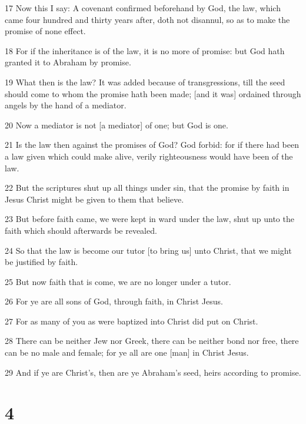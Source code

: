 \par 17 Now this I say: A covenant confirmed beforehand by God, the law, which came four hundred and thirty years after, doth not disannul, so as to make the promise of none effect.
\par 18 For if the inheritance is of the law, it is no more of promise: but God hath granted it to Abraham by promise.
\par 19 What then is the law? It was added because of transgressions, till the seed should come to whom the promise hath been made; [and it was] ordained through angels by the hand of a mediator.
\par 20 Now a mediator is not [a mediator] of one; but God is one.
\par 21 Is the law then against the promises of God? God forbid: for if there had been a law given which could make alive, verily righteousness would have been of the law.
\par 22 But the scriptures shut up all things under sin, that the promise by faith in Jesus Christ might be given to them that believe.
\par 23 But before faith came, we were kept in ward under the law, shut up unto the faith which should afterwards be revealed.
\par 24 So that the law is become our tutor [to bring us] unto Christ, that we might be justified by faith.
\par 25 But now faith that is come, we are no longer under a tutor.
\par 26 For ye are all sons of God, through faith, in Christ Jesus.
\par 27 For as many of you as were baptized into Christ did put on Christ.
\par 28 There can be neither Jew nor Greek, there can be neither bond nor free, there can be no male and female; for ye all are one [man] in Christ Jesus.
\par 29 And if ye are Christ's, then are ye Abraham's seed, heirs according to promise.

\chapter{4}

